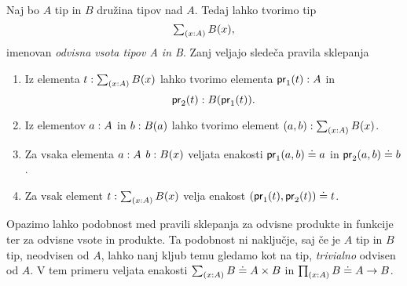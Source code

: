 \begin{definicija}
  Naj bo \(A\) tip in \(B\) družina tipov nad \(A\). Tedaj lahko tvorimo tip
  \[\textstyle \sum_{\left( x : A \right)} B(x),\] imenovan \emph{odvisna vsota tipov A in B}.
  Zanj veljajo sledeča pravila sklepanja
  \begin{enumerate}
  \item Iz elementa \(t : \textstyle \sum_{\left( x : A \right)} B(x)\) lahko tvorimo elementa
    \(\textnormal{\textsf{pr}}_{1}(t) : A\) in
    \[\textnormal{\textsf{pr}}_{2}(t) : B(\textnormal{\textsf{pr}}_{1}(t)).\]
  \item Iz elementov \(a : A\) in \(b : B(a)\) lahko tvorimo
    element \((a, b) : \textstyle \sum_{\left( x : A \right)} B(x)\).
  \item Za vsaka elementa \(a : A\) \(b : B(x)\) veljata
    enakosti \(\textnormal{\textsf{pr}}_{1}(a, b) \doteq a\) in \(\textnormal{\textsf{pr}}_{2}(a, b) \doteq b\).
  \item Za vsak element \(t : \textstyle \sum_{\left( x : A \right)} B(x)\) velja enakost
    \((\textnormal{\textsf{pr}}_{1}(t), \textnormal{\textsf{pr}}_{2}(t)) \doteq t\).
  \end{enumerate}
\end{definicija}

\begin{opomba}
  \label{neodvisna-vsota}
Opazimo lahko podobnost med pravili sklepanja za odvisne produkte in
funkcije ter za odvisne vsote in produkte. Ta podobnost ni naključje, saj če
je \(A\) tip in \(B\) tip, neodvisen od \(A\), lahko nanj kljub temu gledamo kot na tip,
\emph{trivialno} odvisen od \(A\). V tem primeru veljata enakosti
\(\textstyle \sum_{\left( x : A \right)} B \doteq A \times B\) in \(\textstyle \prod_{\left( x : A \right)} B \doteq A \to B\).
\end{opomba}

